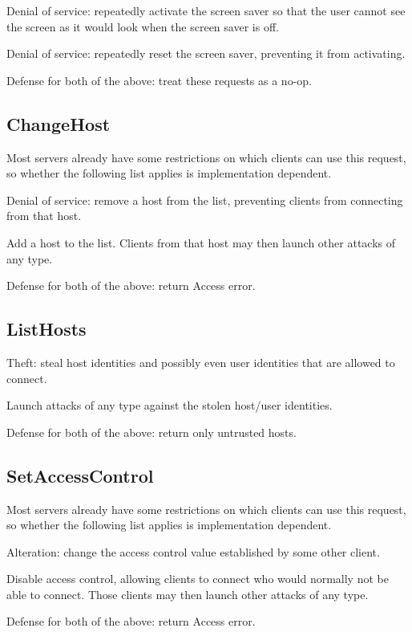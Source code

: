 \documentclass{article}
\begin{document}
Denial of service: repeatedly activate the screen saver so that the
user cannot see the screen as it would look when the screen saver
is off.

Denial of service: repeatedly reset the screen saver, preventing it
from activating.

Defense for both of the above: treat these requests as a no-op.



\subsection{ChangeHost}

Most servers already have some restrictions on which clients can use
this request, so whether the following list applies is implementation
dependent.

Denial of service: remove a host from the list, preventing clients
from connecting from that host.

Add a host to the list.  Clients from that host may then launch
other attacks of any type.

Defense for both of the above: return Access error.


\subsection{ListHosts}

Theft: steal host identities and possibly even user identities that
are allowed to connect.

Launch attacks of any type against the stolen host/user identities.

Defense for both of the above: return only untrusted hosts.



\subsection{SetAccessControl}

Most servers already have some restrictions on which clients can use
this request, so whether the following list applies is implementation
dependent.

Alteration: change the access control value established by some other
client.

Disable access control, allowing clients to connect who would normally
not be able to connect.  Those clients may then launch other attacks
of any type.

Defense for both of the above: return Access error.
\end{document}
